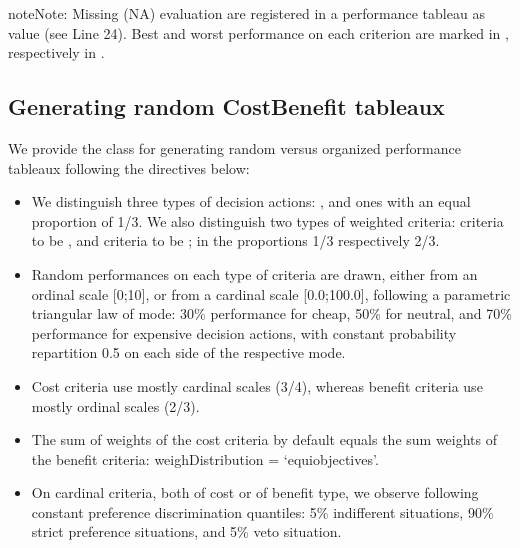 \documentclass[a4paper,10pt,english]{sphinxhowto}
\begin{document}
\begin{sphinxadmonition}{note}{Note:}
Missing (NA) evaluation are registered in a performance tableau as  value (see Line 24). Best and worst performance on each criterion are marked in , respectively in .
\end{sphinxadmonition}


\subsection{Generating random Cost\sphinxhyphen{}Benefit tableaux}
\label{\detokenize{tutorial:generating-random-cost-benefit-tableaux}}
We provide the  class for generating random  versus  organized performance tableaux following the directives below:
\begin{itemize}
\item {} 
We distinguish three types of decision actions: ,  and  ones with an equal proportion of 1/3. We also distinguish two types of weighted criteria:  criteria to be , and  criteria to be ; in the proportions 1/3 respectively 2/3.

\item {} 
Random performances on each type of criteria  are drawn, either from an ordinal scale {[}0;10{]}, or from a cardinal scale {[}0.0;100.0{]}, following a parametric triangular law of mode: 30\% performance for cheap, 50\% for neutral, and 70\% performance for expensive decision actions, with constant probability repartition 0.5 on each side of the respective mode.

\item {} 
Cost criteria use mostly cardinal scales (3/4), whereas benefit criteria use mostly ordinal scales (2/3).

\item {} 
The sum of weights of the cost criteria by default equals the sum weights of the benefit criteria: weighDistribution = ‘equiobjectives’.

\item {} 
On cardinal criteria, both of cost or of benefit type, we observe following constant preference discrimination quantiles: 5\% indifferent situations, 90\% strict preference situations, and 5\% veto situation.

\end{itemize}
\end{document}
